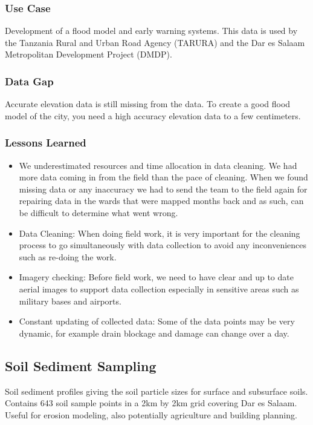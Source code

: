 \documentclass[a4paper,12pt,twoside]{article}
\begin{document}
\subsubsection{Use Case}
Development of a flood model and early warning systems. This data is used by the Tanzania Rural and Urban Road Agency (TARURA) and the Dar es Salaam Metropolitan Development Project (DMDP).

\subsubsection{Data Gap}
Accurate elevation data is still missing from the data. To create a good flood model of the city, you need a high accuracy elevation data to a few centimeters.

\subsubsection{Lessons Learned}
\begin{itemize}
    
\item {\color {RHblue}{Field work outpacing data cleaning and analysis:}}
We underestimated resources and time allocation in data cleaning. We had more data coming in from the field than the pace of cleaning. When we found missing data or any inaccuracy we had to send the team to the field again for repairing data in the wards that were mapped months back and as such, can be difficult to determine what went wrong. 
\item {\color {RHblue} {Data Cleaning:}}
When doing field work, it is very important for the cleaning process to go simultaneously with data collection to avoid any inconveniences such as re-doing the work.
\item{\color {RHblue} {Imagery checking:}}
Before field work, we need to have clear and up to date aerial images to support data collection especially in sensitive areas such as military bases and airports.
\item {\color {RHblue} {Constant updating of collected data:}} Some of the data points may be very dynamic, for example drain blockage and damage can change over a day.
\end{itemize}

\newpage
\subsection{Soil Sediment Sampling}

Soil sediment profiles giving the soil particle sizes for surface and subsurface soils. Contains 643 soil sample points in a 2km by 2km grid covering Dar es Salaam.
Useful for erosion modeling, also potentially agriculture and building planning. 
\end{document}
